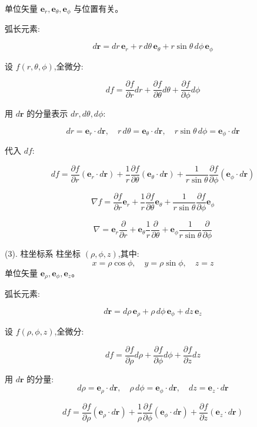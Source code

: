 \documentclass{article}
\begin{document}
单位矢量 $\mathbf{e}_r, \mathbf{e}_\theta, \mathbf{e}_\phi$ 与位置有关。 

弧长元素:  

$$d\mathbf{r} = dr\,\mathbf{e}_r + r\,d\theta\,\mathbf{e}_\theta + r\sin\theta\,d\phi\,\mathbf{e}_\phi$$  

设 $f(r, \theta, \phi)$,全微分:  

$$df = \frac{\partial f}{\partial r} dr + \frac{\partial f}{\partial \theta} d\theta + \frac{\partial f}{\partial \phi} d\phi$$  

用 $d\mathbf{r}$ 的分量表示 $dr, d\theta, d\phi$:  

$$dr = \mathbf{e}_r \cdot d\mathbf{r}, \quad r\,d\theta = \mathbf{e}_\theta \cdot d\mathbf{r}, \quad r\sin\theta\,d\phi = \mathbf{e}_\phi \cdot d\mathbf{r}$$  

代入 $df$:  

$$df = \frac{\partial f}{\partial r} (\mathbf{e}_r \cdot d\mathbf{r}) + \frac{1}{r} \frac{\partial f}{\partial \theta} (\mathbf{e}_\theta \cdot d\mathbf{r}) + \frac{1}{r\sin\theta} \frac{\partial f}{\partial \phi} (\mathbf{e}_\phi \cdot d\mathbf{r})$$  

$$\nabla f = \frac{\partial f}{\partial r} \mathbf{e}_r + \frac{1}{r} \frac{\partial f}{\partial \theta} \mathbf{e}_\theta + \frac{1}{r\sin\theta} \frac{\partial f}{\partial \phi} \mathbf{e}_\phi$$  

$$\nabla = \mathbf{e}_r \frac{\partial}{\partial r} + \mathbf{e}_\theta \frac{1}{r} \frac{\partial}{\partial \theta} + \mathbf{e}_\phi \frac{1}{r\sin\theta} \frac{\partial}{\partial \phi}$$  



 (3). 柱坐标系  
柱坐标 $(\rho, \phi, z)$,其中:  
$$x = \rho \cos\phi, \quad y = \rho \sin\phi, \quad z = z$$  
单位矢量 $\mathbf{e}_\rho, \mathbf{e}_\phi, \mathbf{e}_z$。  

弧长元素:  

$$d\mathbf{r} = d\rho\,\mathbf{e}_\rho + \rho\,d\phi\,\mathbf{e}_\phi + dz\,\mathbf{e}_z$$  

设 $f(\rho, \phi, z)$,全微分:  

$$df = \frac{\partial f}{\partial \rho} d\rho + \frac{\partial f}{\partial \phi} d\phi + \frac{\partial f}{\partial z} dz$$  

用 $d\mathbf{r}$ 的分量:  
$$d\rho = \mathbf{e}_\rho \cdot d\mathbf{r}, \quad \rho\,d\phi = \mathbf{e}_\phi \cdot d\mathbf{r}, \quad dz = \mathbf{e}_z \cdot d\mathbf{r}$$  
 
$$df = \frac{\partial f}{\partial \rho} (\mathbf{e}_\rho \cdot d\mathbf{r}) + \frac{1}{\rho} \frac{\partial f}{\partial \phi} (\mathbf{e}_\phi \cdot d\mathbf{r}) + \frac{\partial f}{\partial z} (\mathbf{e}_z \cdot d\mathbf{r})$$  
  
\end{document}
